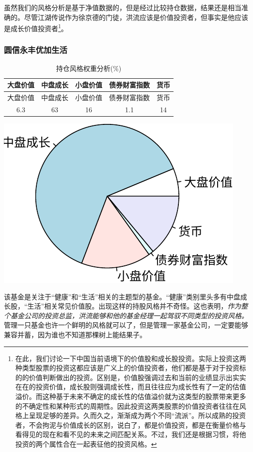 \documentclass[hyperref,]{ctexart}
\begin{document}
虽然我们的风格分析是基于净值数据的，但是经过比较持仓数据，结果还是相当准确的。尽管江湖传说作为徐京德的门徒，洪流应该是价值投资者，但事实是他应该是成长价值投资者\footnote{在此，我们讨论一下中国当前语境下的价值股和成长股投资。实际上投资这两种类型股票的投资这都应该是广义上的价值投资者，他们都是基于对于投资标的的价值判断做出的投资。区别是，价值股强调过去和当前的业绩显示出实实在在的投资价值，成长股则强调成长性，而且往往应为成长性有了一定的估值溢价。而这种基于未来不确定的成长性的估值溢价就为这类型的股票带来更多的不确定性和某种形式的周期性。因此投资这两类股票的价值投资者往往在风格上呈现足够的差异。久而久之，渐渐成为两个不同“流派”。所以成熟的投资者，不会拘泥与价值成长的区别，说白了，都是价值投资，都是在衡量价格与看得见的现在和看不见的未来之间匹配关系。不过，我们还是根据习惯，将他投资的两个属性合在一起表征他的投资风格。}。

\subsubsection{圆信永丰优加生活}\label{-1}

\begin{longtable}[]{@{}ccccc@{}}
\caption{持仓风格权重分析(\%)}\tabularnewline
\toprule
大盘价值 & 中盘成长 & 小盘价值 & 债券财富指数 & 货币\tabularnewline
\midrule
\endfirsthead
\toprule
大盘价值 & 中盘成长 & 小盘价值 & 债券财富指数 & 货币\tabularnewline
\midrule
\endhead
6.3 & 63 & 16 & 1.1 & 14\tabularnewline
\bottomrule
\end{longtable}

\includegraphics{hongliu-details_files/figure-latex/unnamed-chunk-9-1.pdf}

该基金是关注于``健康''和``生活''相关的主题型的基金。``健康''类别里头多有中盘成长股，``生活''相关常见价值股。出现这样的持股风格并不奇怪。这也表明，\emph{作为整个基金公司的投资总监，洪流能够和他的基金经理一起驾驭不同类型的投资风格。}
管理一只基金也许一个鲜明的风格就可以了，但是管理一家基金公司，一定要能够兼容并蓄，因为谁也不知道那棵树上能结果子。
\end{document}
